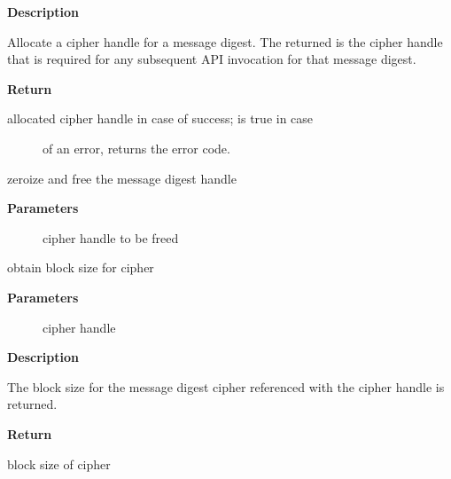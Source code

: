 \documentclass[a4paper,8pt,english]{sphinxmanual}
\begin{document}
\textbf{Description}

Allocate a cipher handle for a message digest. The returned  is the cipher handle that is required for any subsequent
API invocation for that message digest.

\textbf{Return}
\begin{description}
\item[{allocated cipher handle in case of success;  is true in case}] \leavevmode
of an error,  returns the error code.

\end{description}

\begin{fulllineitems}
\label{crypto/api-digest:c.crypto_free_shash}
zeroize and free the message digest handle

\end{fulllineitems}


\textbf{Parameters}
\begin{description}
\item[{}] \leavevmode
cipher handle to be freed

\end{description}

\begin{fulllineitems}
\label{crypto/api-digest:c.crypto_shash_blocksize}
obtain block size for cipher

\end{fulllineitems}


\textbf{Parameters}
\begin{description}
\item[{}] \leavevmode
cipher handle

\end{description}

\textbf{Description}

The block size for the message digest cipher referenced with the cipher
handle is returned.

\textbf{Return}

block size of cipher
\end{document}
